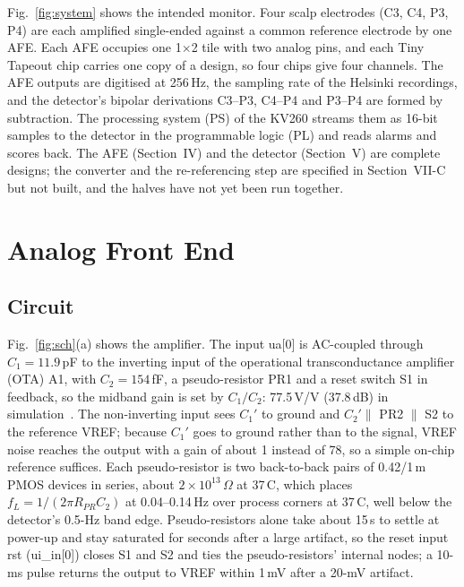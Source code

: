 \documentclass[conference]{IEEEtran}
\newcommand{\um}{\,\textmu m}
\begin{document}
Fig.~\ref{fig:system} shows the intended monitor. Four scalp electrodes (C3, C4, P3, P4) are each amplified single-ended against a common reference electrode by one AFE. Each AFE occupies one 1$\times$2 tile with two analog pins, and each Tiny Tapeout chip carries one copy of a design, so four chips give four channels. The AFE outputs are digitised at 256\,Hz, the sampling rate of the Helsinki recordings, and the detector's bipolar derivations C3--P3, C4--P4 and P3--P4 are formed by subtraction. The processing system (PS) of the KV260 streams them as 16-bit samples to the detector in the programmable logic (PL) and reads alarms and scores back. The AFE (Section~IV) and the detector (Section~V) are complete designs; the converter and the re-referencing step are specified in Section~VII-C but not built, and the halves have not yet been run together.

\section{Analog Front End}

\subsection{Circuit}

Fig.~\ref{fig:sch}(a) shows the amplifier. The input ua[0] is AC-coupled through $C_1 = 11.9$\,pF to the inverting input of the operational transconductance amplifier (OTA) A1, with $C_2 = 154$\,fF, a pseudo-resistor PR1 and a reset switch S1 in feedback, so the midband gain is set by $C_1/C_2$: 77.5\,V/V (37.8\,dB) in simulation~\cite{harrison2003}. The non-inverting input sees $C_1'$ to ground and $C_2' \parallel$ PR2 $\parallel$ S2 to the reference VREF; because $C_1'$ goes to ground rather than to the signal, VREF noise reaches the output with a gain of about 1 instead of 78, so a simple on-chip reference suffices. Each pseudo-resistor is two back-to-back pairs of 0.42/1\um{} PMOS devices in series, about $2\times10^{13}\,\Omega$ at 37\,\textdegree C, which places $f_L = 1/(2\pi R_{PR} C_2)$ at 0.04--0.14\,Hz over process corners at 37\,\textdegree C, well below the detector's 0.5-Hz band edge. Pseudo-resistors alone take about 15\,s to settle at power-up and stay saturated for seconds after a large artifact, so the reset input rst (ui\_in[0]) closes S1 and S2 and ties the pseudo-resistors' internal nodes; a 10-ms pulse returns the output to VREF within 1\,mV after a 20-mV artifact.
\end{document}
